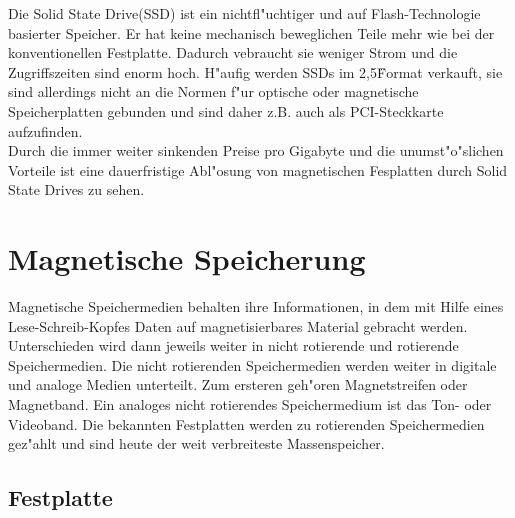 				Die Solid State Drive(SSD) ist ein nichtfl"uchtiger und auf Flash-Technologie basierter Speicher. Er hat keine mechanisch beweglichen Teile mehr wie bei der konventionellen Festplatte. Dadurch vebraucht sie weniger Strom und die Zugriffszeiten sind enorm hoch. H"aufig werden SSDs im 2,5\" Format verkauft, sie sind allerdings nicht an die Normen f"ur optische oder magnetische Speicherplatten gebunden und sind daher z.B. auch als PCI-Steckkarte aufzufinden.
				\\
				Durch die immer weiter sinkenden Preise pro Gigabyte und die unumst"o"slichen Vorteile ist eine dauerfristige Abl"osung von magnetischen Fesplatten durch Solid State Drives zu sehen.
				
				
			
			
			
    \section{Magnetische Speicherung}
    \label{ch:Technisch:sec:Magnetische Speicherung}
    
    Magnetische Speichermedien behalten ihre Informationen, in dem mit Hilfe eines Lese-Schreib-Kopfes Daten auf magnetisierbares Material gebracht werden. Unterschieden wird dann jeweils weiter in nicht rotierende und rotierende Speichermedien. Die nicht rotierenden Speichermedien werden weiter in digitale und analoge Medien unterteilt. Zum ersteren geh"oren Magnetstreifen oder Magnetband. Ein analoges nicht rotierendes Speichermedium ist das Ton- oder Videoband. Die bekannten Festplatten werden zu rotierenden Speichermedien gez"ahlt und sind heute der weit verbreiteste Massenspeicher.

        \subsection{Festplatte}
        \label{ch:Technisch:sec:Magnetische Speicherung:sub:Festplatte}
        
